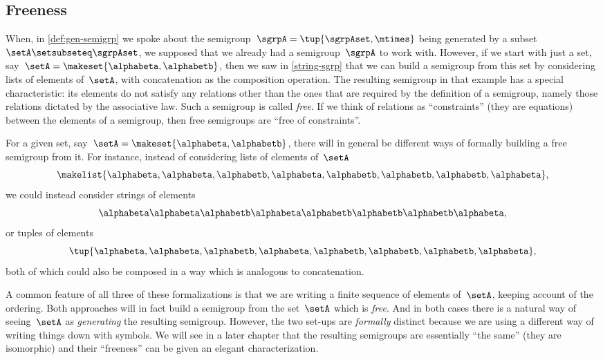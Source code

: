 \subsection{Freeness}

When, in \cref{def:gen-semigrp} we spoke about the semigroup~$\sgrpA = \tup{\sgrpAset, \mtimes}$  being generated by a subset~$\setA \setsubseteq \sgrpAset$, we supposed that we already had a semigroup~$\sgrpA$ to work with.
However, if we start with just a set, say~$\setA = \makeset{ \alphabeta, \alphabetb}$, then we saw in \cref{string-sgrp} that we can build a semigroup from this set by considering lists of elements of~$\setA$, with concatenation as the composition operation.
The resulting semigroup in that example has a special characteristic: its elements do not satisfy any relations other than the ones that are required by the definition of a semigroup, namely those relations dictated by the associative law.
Such a semigroup is called \emph{free}.
If we think of relations as ``constraints'' (they are equations) between the elements of a semigroup, then free semigroups are ``free of constraints''.

For a given set, say~$\setA = \makeset{ \alphabeta, \alphabetb}$, there will in general be different ways of formally building a free semigroup from it.
For instance, instead of considering lists of elements of~$\setA$
\begin{equation}
    \makelist{\alphabeta,\alphabeta, \alphabetb, \alphabeta, \alphabetb, \alphabetb, \alphabetb, \alphabeta},
\end{equation}
we could instead consider strings of elements
\begin{equation}
    \alphabeta\alphabeta \alphabetb \alphabeta \alphabetb \alphabetb \alphabetb \alphabeta,
\end{equation}
or tuples of elements
\begin{equation}
    \tup{ \alphabeta, \alphabeta,  \alphabetb,  \alphabeta,  \alphabetb,  \alphabetb,  \alphabetb,  \alphabeta},
\end{equation}
both of which could also be composed in a way which is analogous to concatenation.

A common feature of all three of these formalizations is that we are writing a finite sequence of elements of~$\setA$, keeping account of the ordering.
Both approaches will in fact build a semigroup from the set~$\setA$ which is \emph{free}.
And in both cases there is a natural way of seeing~$\setA$ as \emph{generating} the resulting semigroup.
However, the two set-ups are \emph{formally} distinct because we are using a different way of writing things down with symbols.
We will see in a later chapter that the resulting semigroups are essentially ``the same'' (they are isomorphic) and their ``freeness'' can be given an elegant characterization.

